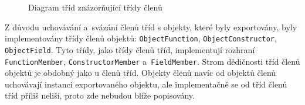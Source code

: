 \begin{figure}[H]
  \begin{center}
    \caption{Diagram tříd znázorňující třídy členů}
    \label{Figure.ClassMember}
  \end{center}
\end{figure}

\vspace{-1em}

Z důvodu uchovávání a~svázání členů tříd s objekty, které byly exportovány, byly implementovány třídy členů objektů: \texttt{ObjectFunction}, \texttt{ObjectConstructor}, \texttt{ObjectField}. Tyto třídy, jako třídy členů tříd, implementují rozhraní \texttt{FunctionMember}, \texttt{ConstructorMember} a~\texttt{FieldMember}. Strom dědičnosti tříd členů objektů je obdobný jako u členů tříd. Objekty členů navíc od objektů členů uchovávají instanci exportovaného objektu, ale implementačně se od tříd členů tříd příliš neliší, proto zde nebudou blíže popisovány.

